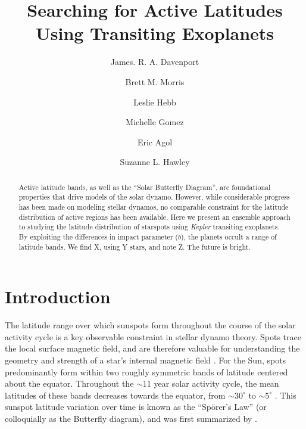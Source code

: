 \documentclass[preprint2]{aastex62}
\newcommand{\Kepler}{\textsl{Kepler}\xspace}
\begin{document}
\title{Searching for Active Latitudes Using Transiting Exoplanets}



\author{James. R. A. Davenport}

\author{Brett M. Morris}

\author{Leslie Hebb}

\author{Michelle Gomez}

\author{Eric Agol}

\author{Suzanne L. Hawley}



\begin{abstract}
Active latitude bands, as well as the ``Solar Butterfly Diagram'', are foundational properties that drive models of the solar dynamo. However, while considerable progress has been made on modeling stellar dynamos, no comparable constraint for the latitude distribution of active regions has been available. Here we present an ensemble approach to studying the latitude distribution of starspots using \Kepler transiting exoplanets. By exploiting the differences in impact parameter ($b$), the planets occult a range of latitude bands. We find X, using Y stars, and note Z. The future is bright.
\end{abstract}



\section{Introduction}
\label{sec:intro}

The latitude range over which sunspots form throughout the course of the solar activity cycle is a key observable constraint in stellar dynamo theory. 
Spots trace the local surface magnetic field, and are therefore valuable for understanding the geometry and strength of a star's internal magnetic field \citep{berdyugina2005}.
For the Sun, spots predominantly form within two roughly symmetric bands of latitude centered about the equator. Throughout the $\sim$11 year solar activity cycle, the mean latitudes of these bands decreases towards the equator, from $\sim$$30^\circ$ to $\sim$$5^\circ$ \citep[e.g. see][]{babcock1961}. This sunspot latitude variation over time is known as the ``Sp\"{o}rer's Law'' (or colloquially as the Butterfly diagram), and was first summarized by \citet{maunder1904}.
\end{document}
